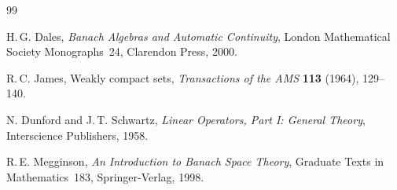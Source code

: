 \documentclass[a4paper,12pt]{book}
\theoremstyle{definition}
\theoremstyle{plain}
\theoremstyle{remark}
\begin{document}
\begin{thebibliography}{99}

H.\,G. Dales,
\emph{Banach Algebras and Automatic Continuity},
London Mathematical Society Monographs~24, Clarendon Press, 2000.

R.\,C. James,
Weakly compact sets,
\emph{Transactions of the AMS} \textbf{113} (1964), 129--140.

N. Dunford and J.\,T. Schwartz,
\emph{Linear Operators, Part I: General Theory},
Interscience Publishers, 1958.

R.\,E. Megginson,
\emph{An Introduction to Banach Space Theory},
Graduate Texts in Mathematics~183, Springer-Verlag, 1998.

\end{thebibliography}

\printindex
\end{document}
